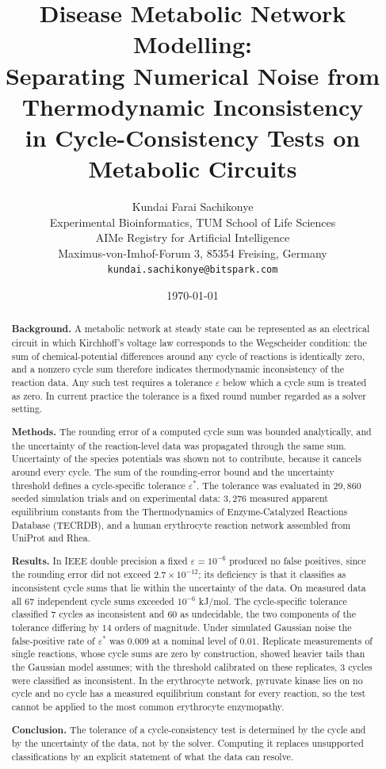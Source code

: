 \documentclass[11pt,a4paper]{article}
\title{\textbf{Disease Metabolic Network Modelling:}\\[4pt]
\large Separating Numerical Noise from Thermodynamic Inconsistency\\
in Cycle-Consistency Tests on Metabolic Circuits}
\author{%
Kundai Farai Sachikonye\\[0.3em]
\normalsize Experimental Bioinformatics, TUM School of Life Sciences\\
\normalsize AIMe Registry for Artificial Intelligence \\
\normalsize Maximus-von-Imhof-Forum 3, 85354 Freising, Germany\\
\normalsize \texttt{kundai.sachikonye@bitspark.com}}
\date{\today}
\theoremstyle{pstyle}
\theoremstyle{definition}
\theoremstyle{remark}
\newcommand{\eps}{\varepsilon}
\newcommand{\epsstar}{\eps^{\ast}}
\begin{document}
\maketitle

\begin{abstract}
\noindent
\textbf{Background.} A metabolic network at steady state can be
represented as an electrical circuit in which Kirchhoff's voltage law
corresponds to the Wegscheider condition: the sum of chemical-potential
differences around any cycle of reactions is identically zero, and a
nonzero cycle sum therefore indicates thermodynamic inconsistency of the
reaction data. Any such test requires a tolerance $\eps$ below which a
cycle sum is treated as zero. In current practice the tolerance is a
fixed round number regarded as a solver setting.

\textbf{Methods.} The rounding error of a computed cycle sum was bounded
analytically, and the uncertainty of the reaction-level data was
propagated through the same sum. Uncertainty of the species potentials
was shown not to contribute, because it cancels around every cycle. The
sum of the rounding-error bound and the uncertainty threshold defines a
cycle-specific tolerance $\epsstar$. The tolerance was evaluated in
$29{,}860$ seeded simulation trials and on experimental data: $3{,}276$
measured apparent equilibrium constants from the Thermodynamics of
Enzyme-Catalyzed Reactions Database (TECRDB), and a human erythrocyte
reaction network assembled from UniProt and Rhea.

\textbf{Results.} In IEEE double precision a fixed $\eps=10^{-6}$
produced no false positives, since the rounding error did not exceed
$2.7\times10^{-12}$; its deficiency is that it classifies as
inconsistent cycle sums that lie within the uncertainty of the data. On
measured data all $67$ independent cycle sums exceeded $10^{-6}$ kJ/mol.
The cycle-specific tolerance classified $7$ cycles as inconsistent and
$60$ as undecidable, the two components of the tolerance differing by
$14$ orders of magnitude. Under simulated Gaussian noise the
false-positive rate of $\epsstar$ was $0.009$ at a nominal level of
$0.01$. Replicate measurements of single reactions, whose cycle sums are
zero by construction, showed heavier tails than the Gaussian model
assumes; with the threshold calibrated on these replicates, $3$ cycles
were classified as inconsistent. In the erythrocyte network, pyruvate
kinase lies on no cycle and no cycle has a measured equilibrium constant
for every reaction, so the test cannot be applied to the most common
erythrocyte enzymopathy.

\textbf{Conclusion.} The tolerance of a cycle-consistency test is
determined by the cycle and by the uncertainty of the data, not by the
solver. Computing it replaces unsupported classifications by an explicit
statement of what the data can resolve.
\end{abstract}
\end{document}
